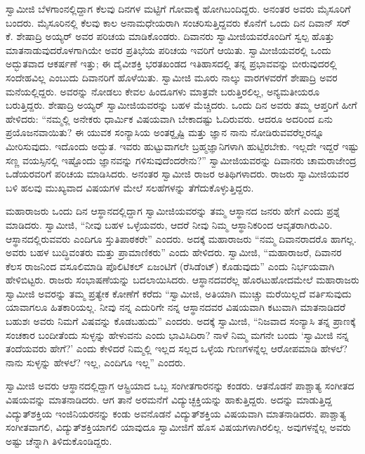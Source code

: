  ಸ್ವಾಮೀಜಿ ಬೆಳಗಾಂನಲ್ಲಿದ್ದಾಗ ಕೆಲವು ದಿನಗಳ ಮಟ್ಟಿಗೆ ಗೋವಾಕ್ಕೆ ಹೋಗಿಬಂದಿದ್ದರು. ಅನಂತರ ಅವರು ಮೈಸೂರಿಗೆ ಬಂದರು. ಮೈಸೂರಿನಲ್ಲಿ ಕೆಲವು ಕಾಲ ಅನಾಮಧೇಯರಾಗಿ ಸಂಚರಿಸುತ್ತಿದ್ದವರು ಕೊನೆಗೆ ಒಂದು ದಿನ ದಿವಾನ್ ಸರ್ ಕೆ. ಶೇಷಾದ್ರಿ ಅಯ್ಯರ್ ಅವರ ಪರಿಚಯ ಮಾಡಿಕೊಂಡರು. ದಿವಾನರು ಸ್ವಾಮೀಜಿಯವರೊಂದಿಗೆ ಸ್ವಲ್ಪ ಹೊತ್ತು ಮಾತನಾಡುವುದರೊಳಗಾಗಿಯೇ ಅವರ ಪ್ರತಿಭೆಯ ಪರಿಚಯ ಇವರಿಗೆ ಆಯಿತು. ಸ್ವಾಮೀಜಿಯವರಲ್ಲಿ ಒಂದು ಅದ್ಭುತವಾದ ಆಕರ್ಷಣೆ ಇತ್ತು; ಈ ದೈವೀಶಕ್ತಿ ಭರತಖಂಡದ ಇತಿಹಾಸದಲ್ಲಿ ತನ್ನ ಪ್ರಭಾವವನ್ನು ಬೀರುವುದರಲ್ಲಿ ಸಂದೇಹವಿಲ್ಲ ಎಂಬುದು ದಿವಾನರಿಗೆ ಹೊಳೆಯಿತು. ಸ್ವಾಮೀಜಿ ಮೂರು ನಾಲ್ಕು ವಾರಗಳವರೆಗೆ ಶೇಷಾದ್ರಿ ಅವರ ಮನೆಯಲ್ಲಿದ್ದರು. ಅವರನ್ನು ನೋಡಲು ಕೇವಲ ಹಿಂದೂಗಳು ಮಾತ್ರವೇ ಬರುತ್ತಿರಲಿಲ್ಲ, ಅನ್ಯಮತೀಯರೂ ಬರುತ್ತಿದ್ದರು. ಶೇಷಾದ್ರಿ ಅಯ್ಯರ್ ಸ್ವಾಮೀಜಿಯವರನ್ನು ಬಹಳ ಮೆಚ್ಚಿದರು. ಒಂದು ದಿನ ಅವರು ತಮ್ಮ ಆಪ್ತರಿಗೆ ಹೀಗೆ ಹೇಳಿದರು: “ನಮ್ಮಲ್ಲಿ ಅನೇಕರು ಧಾರ್ಮಿಕ ವಿಷಯವಾಗಿ ಬೇಕಾದಷ್ಟು ಓದಿರುವರು. ಆದರೂ ಅದರಿಂದ ಏನು ಪ್ರಯೊಜನವಾಯಿತು? ಈ ಯುವಕ ಸಂನ್ಯಾಸಿಯ ಅಂತರ್‍ದೃಷ್ಟಿ ಮತ್ತು ಜ್ಞಾನ ನಾನು ನೋಡಿರುವವರೆಲ್ಲರನ್ನೂ ಮೀರಿಸುವುದು. ಇದೊಂದು ಅದ್ಭುತ. ಇವರು ಹುಟ್ಟುವಾಗಲೇ ಬ್ರಹ್ಮಜ್ಞಾನಿಗಳಾಗಿ ಹುಟ್ಟಿರಬೇಕು. ಇಲ್ಲದೇ ಇದ್ದರೆ ಇಷ್ಟು ಸಣ್ಣ ವಯಸ್ಸಿನಲ್ಲಿ ಇಷ್ಟೊಂದು ಜ್ಞಾನವನ್ನು ಗಳಿಸುವುದೆಂದರೇನು?” ಸ್ವಾಮೀಜಿಯವರನ್ನು ದಿವಾನರು ಚಾಮರಾಜೇಂದ್ರ ಒಡೆಯರವರಿಗೆ ಪರಿಚಯ ಮಾಡಿಸಿದರು. ಅನಂತರ ಸ್ವಾಮೀಜಿ ರಾಜರ ಅತಿಥಿಗಳಾದರು. ರಾಜರು ಸ್ವಾಮೀಜಿಯವರ ಬಳಿ ಹಲವು ಮುಖ್ಯವಾದ ವಿಷಯಗಳ ಮೇಲೆ ಸಲಹೆಗಳನ್ನು ತೆಗೆದುಕೊಳ್ಳುತ್ತಿದ್ದರು. 

 ಮಹಾರಾಜರು ಒಂದು ದಿನ ಆಸ್ಥಾನದಲ್ಲಿದ್ದಾಗ ಸ್ವಾಮೀಜಿಯವರನ್ನು ತಮ್ಮ ಆಸ್ಥಾನದ ಜನರು ಹೇಗೆ ಎಂದು ಪ್ರಶ್ನೆ ಮಾಡಿದರು. ಸ್ವಾಮೀಜಿ, “ನೀವು ಬಹಳ ಒಳ್ಳೆಯವರು, ಆದರೆ ನೀವು ನಿಮ್ಮ ಆಸ್ಥಾನಿಕರಿಂದ ಆವೃತರಾಗಿರುವಿರಿ. ಆಸ್ಥಾನದಲ್ಲಿರುವವರು ಎಂದಿಗೂ ಸ್ತುತಿಪಾಠಕರೇ” ಎಂದರು. ಅದಕ್ಕೆ ಮಹಾರಾಜರು “ನಮ್ಮ ದಿವಾನರಾದರೊ ಹಾಗಲ್ಲ. ಅವರು ಬಹಳ ಬುದ್ಧಿವಂತರು ಮತ್ತು ಪ್ರಾಮಾಣಿಕರು” ಎಂದು ಹೇಳಿದರು. ಸ್ವಾಮೀಜಿ, “ಮಹಾರಾಜರೆ, ದಿವಾನರ ಕೆಲಸ ರಾಜನಿಂದ ವಸೂಲಿಮಾಡಿ ಪೊಲಿಟಿಕಲ್ ಏಜಂಟಿಗೆ (ರೆಸಿಡೆಂಟ್) ಕೊಡುವುದು” ಎಂದು ನಿರ್ಭಯವಾಗಿ ಹೇಳಿಬಿಟ್ಟರು. ರಾಜರು ಸಂಭಾಷಣೆಯನ್ನು ಬದಲಾಯಿಸಿದರು. ಆಸ್ಥಾನದವರೆಲ್ಲ ಹೊರಟುಹೋದಮೇಲೆ ಮಹಾರಾಜರು ಸ್ವಾಮೀಜಿ ಅವರನ್ನು ತಮ್ಮ ಪ್ರತ್ಯೇಕ ಕೋಣೆಗೆ ಕರೆದು “ಸ್ವಾಮೀಜಿ, ಅತಿಯಾಗಿ ಮುಚ್ಚು ಮರೆಯಿಲ್ಲದೆ ವರ್ತಿಸುವುದು ಯಾವಾಗಲೂ ಹಿತಕಾರಿಯಲ್ಲ. ನೀವು ನನ್ನ ಎದುರಿಗೇ ನನ್ನ ಆಸ್ಥಾನದವರ ವಿಷಯವಾಗಿ ಕಟುವಾಗಿ ಮಾತನಾಡಿದರೆ ಬಹುಶಃ ಅವರು ನಿಮಗೆ ವಿಷವನ್ನು ಕೊಡಬಹುದು” ಎಂದರು. ಅದಕ್ಕೆ ಸ್ವಾಮೀಜಿ, “ನಿಜವಾದ ಸಂನ್ಯಾಸಿ ತನ್ನ ಪ್ರಾಣಕ್ಕೆ ಸಂಚಕಾರ ಬಂದೀತೆಂದು ಸುಳ್ಳನ್ನು ಹೇಳುವನು ಎಂದು ಭಾವಿಸಿದಿರಾ? ನಾಳೆ ನಿಮ್ಮ ಮಗನೇ ಬಂದು ‘ಸ್ವಾಮೀಜಿ ನನ್ನ ತಂದೆಯವರು ಹೇಗೆ?’ ಎಂದು ಕೇಳಿದರೆ ನಿಮ್ಮಲ್ಲಿ ಇಲ್ಲದ ಸಲ್ಲದ ಒಳ್ಳೆಯ ಗುಣಗಳನ್ನೆಲ್ಲ ಆರೋಪಮಾಡಿ ಹೇಳಲೆ? ನಾನು ಸುಳ್ಳನ್ನು ಹೇಳಲೆ? ಇಲ್ಲ, ಎಂದಿಗೂ ಇಲ್ಲ” ಎಂದರು. 

 ಸ್ವಾಮೀಜಿ ಅವರು ಆಸ್ಥಾನದಲ್ಲಿದ್ದಾಗ ಆಸ್ಟ್ರಿಯಾದ ಒಬ್ಬ ಸಂಗೀತಗಾರನನ್ನು ಕಂಡರು. ಆತನೊಡನೆ ಪಾಶ್ಚಾತ್ಯ ಸಂಗೀತದ ವಿಷಯವನ್ನು ಮಾತನಾಡಿದರು. ಆಗ ತಾನೆ ಅರಮನೆಗೆ ವಿದ್ಯುಚ್ಛಕ್ತಿಯನ್ನು ಹಾಕುತ್ತಿದ್ದರು. ಅದನ್ನು ಮಾಡುತ್ತಿದ್ದ ವಿದ್ಯುತ್‍ಶಕ್ತಿಯ ಇಂಜಿನಿಯರನನ್ನು ಕಂಡು ಅವನೊಡನೆ ವಿದ್ಯುತ್‍ಶಕ್ತಿಯ ವಿಷಯವಾಗಿ ಮಾತನಾಡಿದರು. ಪಾಶ್ಚಾತ್ಯ ಸಂಗೀತವಾಗಲಿ, ವಿದ್ಯುತ್‍ಶಕ್ತಿಯಾಗಲಿ ಯಾವುದೂ ಸ್ವಾಮೀಜಿಗೆ ಹೊಸ ವಿಷಯಗಳಾಗಿರಲಿಲ್ಲ. ಅವುಗಳನ್ನೆಲ್ಲ ಅವರು ಅಷ್ಟು ಚೆನ್ನಾಗಿ ತಿಳಿದುಕೊಂಡಿದ್ದರು. 

